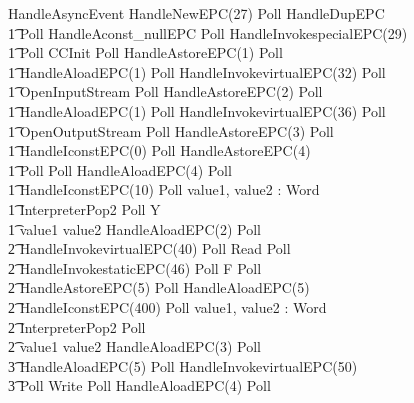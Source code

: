 \begin{figure}[p!]
  \begin{circus}
    HandleAsyncEvent \circdef HandleNewEPC(27) \circseq Poll \circseq HandleDupEPC \circseq \\
    \t1 Poll \circseq HandleAconst\_nullEPC \circseq Poll \circseq HandleInvokespecialEPC(29) \circseq \\
    \t1 Poll \circseq CCInit \circseq Poll \circseq HandleAstoreEPC(1) \circseq Poll \circseq \\
    \t1 HandleAloadEPC(1) \circseq Poll \circseq HandleInvokevirtualEPC(32) \circseq Poll \circseq \\
    \t1 OpenInputStream \circseq Poll \circseq HandleAstoreEPC(2) \circseq Poll \circseq \\
    \t1 HandleAloadEPC(1) \circseq Poll \circseq HandleInvokevirtualEPC(36) \circseq Poll \circseq \\
    \t1 OpenOutputStream \circseq Poll \circseq HandleAstoreEPC(3) \circseq Poll \circseq \\
    \t1 HandleIconstEPC(0) \circseq Poll \circseq HandleAstoreEPC(4) \circseq \\
    \t1 Poll \circseq Poll \circseq HandleAloadEPC(4) \circseq Poll \circseq \\
    \t1 HandleIconstEPC(10) \circseq Poll \circseq \circvar value1, value2 : Word \circspot \\
    \t1 InterpreterPop2 \circseq Poll \circseq \circmu Y \circspot \\
    \t1 \circif value1 \leq value2 \circthen HandleAloadEPC(2) \circseq Poll \circseq \\
    \t2 HandleInvokevirtualEPC(40) \circseq Poll \circseq Read \circseq Poll \circseq \\
    \t2 HandleInvokestaticEPC(46) \circseq Poll \circseq F \circseq Poll \circseq \\
    \t2 HandleAstoreEPC(5) \circseq Poll \circseq HandleAloadEPC(5) \circseq \\
    \t2 HandleIconstEPC(400) \circseq Poll \circseq \circvar value1, value2 : Word \circspot \\
    \t2 InterpreterPop2 \circseq Poll \circseq \\
    \t2 \circif value1 \leq value2 \circthen HandleAloadEPC(3) \circseq Poll \circseq \\
    \t3 HandleAloadEPC(5) \circseq Poll \circseq HandleInvokevirtualEPC(50) \circseq \\
    \t3 Poll \circseq Write \circseq Poll \circseq HandleAloadEPC(4) \circseq Poll \circseq \\

\end{circus}
\end{figure}
